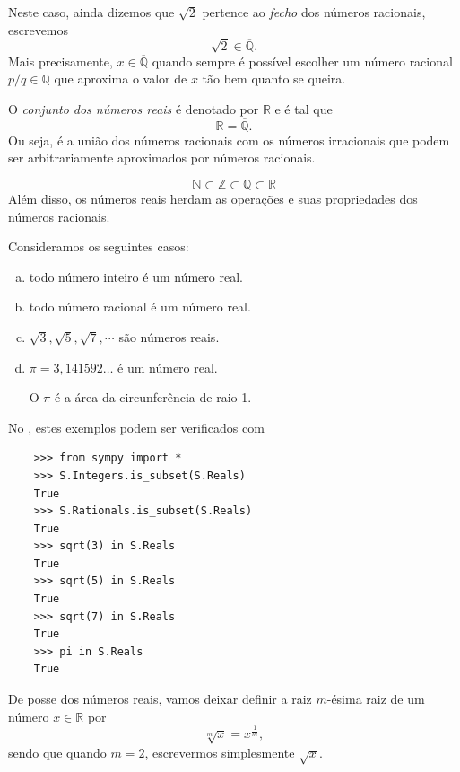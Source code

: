 Neste caso, ainda dizemos que $\sqrt{2}$ pertence ao \emph{fecho} dos números racionais, escrevemos
\begin{equation}
  \sqrt{2}\in\overline{\mathbb{Q}}.
\end{equation}
Mais precisamente, $x\in\overline{\mathbb{Q}}$ quando sempre é possível escolher um número racional $p/q\in\mathbb{Q}$ que aproxima o valor de $x$ tão bem quanto se queira.

O \emph{conjunto dos números reais} é denotado por $\mathbb{R}$ e é tal que
\begin{equation}
  \mathbb{R} = \overline{\mathbb{Q}}.
\end{equation}
Ou seja, é a união dos números racionais com os números irracionais que podem ser arbitrariamente aproximados por números racionais.

\begin{obs}
  \begin{equation}
    \mathbb{N}\subset\mathbb{Z}\subset\mathbb{Q}\subset\mathbb{R}
  \end{equation}
  Além disso, os números reais herdam as operações e suas propriedades dos números racionais.
\end{obs}

\begin{ex}
  Consideramos os seguintes casos:
  \begin{enumerate}[a)]
  \item todo número inteiro é um número real.
  \item todo número racional é um número real.
  \item $\sqrt{3}, \sqrt{5}, \sqrt{7}, \cdots$ são números reais.
  \item $\pi = 3,141592\ldots$ é um número real.

    O $\pi$ é a área da circunferência de raio 1.
  \end{enumerate}

  \ifispython
  No \python, estes exemplos podem ser verificados com
  \begin{lstlisting}
    >>> from sympy import *
    >>> S.Integers.is_subset(S.Reals)
    True
    >>> S.Rationals.is_subset(S.Reals)
    True
    >>> sqrt(3) in S.Reals
    True
    >>> sqrt(5) in S.Reals
    True
    >>> sqrt(7) in S.Reals
    True
    >>> pi in S.Reals
    True
  \end{lstlisting}
  \fi
\end{ex}

De posse dos números reais, vamos deixar definir a raiz $m$-ésima raiz de um número $x\in\mathbb{R}$ por
\begin{equation}
  \sqrt[m]{x} = x^{\frac{1}{m}},
\end{equation}
sendo que quando $m=2$, escrevermos simplesmente $\sqrt{x}$.

